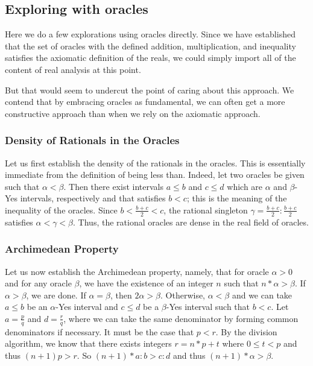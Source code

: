 \documentclass[12pt]{article}
\theoremstyle{remark}
\begin{document}
\subsection{Exploring with oracles}

Here we do a few explorations using oracles directly. Since we have established that the set of oracles with the defined addition, multiplication, and inequality satisfies the axiomatic definition of the reals, we could simply import all of the content of real analysis at this point. 

But that would seem to undercut the point of caring about this approach. We contend that by embracing oracles as fundamental, we can often get a more constructive approach than when we rely on the axiomatic approach. 

\subsubsection{Density of Rationals in the Oracles}

Let us first establish the density of the rationals in the oracles. This is essentially immediate from the definition of being less than. Indeed, let two oracles be given such that $\alpha < \beta$. Then there exist intervals $a\leq b$ and $c\leq d$ which are $\alpha$ and $\beta$-Yes intervals, respectively and that satisfies $b < c$; this is the meaning of the inequality of the oracles. Since $b < \frac{b+c}{2} < c$, the rational singleton $\gamma = \frac{b+c}{2}:\frac{b+c}{2}$ satisfies $\alpha < \gamma < \beta$. Thus, the rational oracles are dense in the real field of oracles. 

\subsubsection{Archimedean Property}

Let us now establish the Archimedean property, namely, that for oracle $\alpha > 0$ and for any oracle $\beta$, we have the existence of an integer $n$ such that $n * \alpha > \beta $. If $\alpha > \beta$, we are done. If $\alpha = \beta$, then $2 \alpha > \beta$. Otherwise, $\alpha < \beta$ and we can take $a\leq b$ be an $\alpha$-Yes interval and $c \leq d$ be a $\beta$-Yes interval such that $b < c$. Let $a = \frac{p}{q}$ and $d = \frac{r}{q}$, where we can take the same denominator by forming common denominators if necessary. It must be the case that $p < r$. By the division algorithm, we know that there exists integers $r = n*p + t$ where $0 \leq  t<p$ and thus $(n+1)p > r$. So $(n+1)*a:b > c:d$ and thus $(n+1)*\alpha > \beta$.
\end{document}
